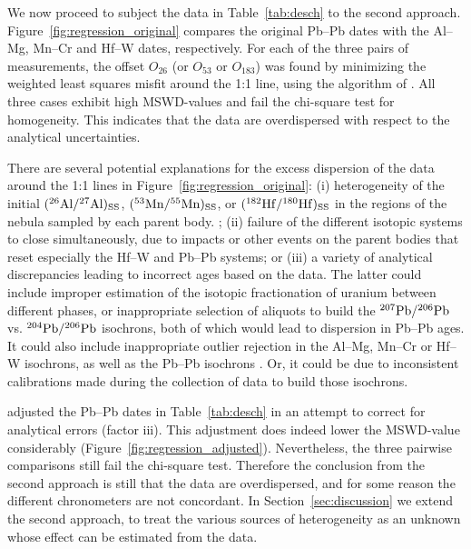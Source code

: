 We now proceed to subject the data in Table~\ref{tab:desch} to the
second approach.  Figure~\ref{fig:regression_original} compares the
original Pb--Pb dates with the Al--Mg, Mn--Cr and Hf--W dates,
respectively.  For each of the three pairs of measurements, the offset
${O}_{26}$ (or ${O}_{53}$ or ${O}_{183}$) was found by minimizing the
weighted least squares misfit around the 1:1 line, using the algorithm
of \citet{vermeesch2024}.  All three cases exhibit high MSWD-values
and fail the chi-square test for homogeneity.  This indicates that the
data are overdispersed with respect to the analytical
uncertainties.\medskip

There are several potential explanations for the excess dispersion of
the data around the 1:1 lines in Figure~\ref{fig:regression_original}:
(i) heterogeneity of the initial $(\mbox{${}^{26}{\rm Al}/{}^{27}{\rm Al}$})_{\rm SS}$, $({}^{53}{\rm
  Mn}/{}^{55}{\rm Mn})_{\rm SS}$, or $({}^{182}{\rm Hf}/{}^{180}{\rm
  Hf})_{\rm SS}$ in the regions of the nebula sampled by each parent
body.  \citep[e.g.,][]{bollard2019, krestianinov2023}; (ii) failure of
the different isotopic systems to close simultaneously, due to impacts
or other events on the parent bodies that reset especially the Hf--W
and Pb--Pb systems; or (iii) a variety of analytical discrepancies
leading to incorrect ages based on the data.  The latter could include
improper estimation of the isotopic fractionation of uranium between
different phases, or inappropriate selection of aliquots to build the
${}^{207}{\rm Pb}/{}^{206}{\rm Pb}$ vs. ${}^{204}{\rm Pb}/{}^{206}{\rm
  Pb}$ isochrons, both of which would lead to dispersion in Pb--Pb
ages.  It could also include inappropriate outlier rejection in the
Al--Mg, Mn--Cr or Hf--W isochrons, as well as the Pb--Pb isochrons
\citep{desch2023a,vermeesch2026f}.  Or, it could be due to
inconsistent calibrations made during the collection of data to build
those isochrons.\medskip

\citet{desch2023a,desch2023b} adjusted the Pb--Pb dates in
Table~\ref{tab:desch} in an attempt to correct for analytical errors
(factor iii).  This adjustment does indeed lower the MSWD-value
considerably (Figure~\ref{fig:regression_adjusted}).  Nevertheless,
the three pairwise comparisons still fail the chi-square test.
Therefore the conclusion from the second approach is still that the
data are overdispersed, and for some reason the different chronometers
are not concordant. In Section~\ref{sec:discussion} we extend the
second approach, to treat the various sources of heterogeneity as an
unknown whose effect can be estimated from the data.

